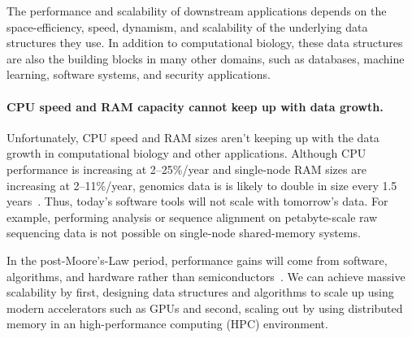The performance and scalability of downstream applications depends on the space-efficiency, speed, dynamism, and scalability of the
underlying data structures they use. In addition to computational biology, these data structures are also the building blocks in many other domains, such as databases, machine learning, software systems, and security applications.


%


\label{sec:we-need-performance-and-scalability}
\paragraph{CPU speed and RAM capacity cannot keep up with data growth.}
Unfortunately, CPU speed and RAM sizes aren't keeping up with the data growth in computational biology and other applications.
Although CPU performance is increasing at 2--25\%/year and single-node RAM sizes are increasing at 2--11\%/year, genomics data is is likely to double in size every 1.5 years~\cite{kodama2012sequence}.
Thus, today's software tools will not scale with tomorrow's data. For example, performing \kmer analysis or sequence alignment on petabyte-scale raw sequencing data is not possible on single-node shared-memory systems.

In the post-Moore’s-Law period, performance gains will come from software, algorithms, and hardware rather than semiconductors~\cite{leiserson2020there}. We can achieve massive scalability by first, designing data structures and algorithms to scale up using modern accelerators such as GPUs and second, scaling out by using distributed memory in an high-performance computing (HPC) environment.



